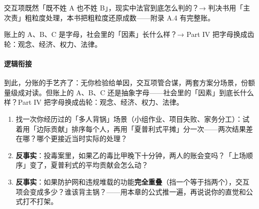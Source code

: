 \documentclass[../../main2.tex]{subfiles}
\begin{document}
\begin{reader_anticipation}
	\item 交互项既然「既不姓 A 也不姓 B」，现实中法官到底怎么判的？→ 判决书用「主次责」粗粒度处理，本书把粗粒度还原成数——附录 A.4 有完整账。
	\item 账上的 A、B、C 是字母，社会里的「因素」长什么样？→ Part IV 把字母换成齿轮：观念、经济、权力、法律。
\end{reader_anticipation}

\paragraph*{逻辑衔接}
	到此，分账的手艺齐了：无你检验给单因，交互项管合谋，两套方案分场景，份额量级成对读。但账上的 A、B、C 还是抽象字母——社会里的「因素」到底长什么样？Part IV 把字母换成齿轮：观念、经济、权力、法律。

\begin{thinkbox}
\begin{enumerate}
	\item 找一次你经历过的「多人背锅」场景（小组作业、项目失败、家务分工）：试着用「边际贡献」排序每个人，再用「夏普利式平摊」分一次——两次结果差在哪？哪个更接近当时实际的处理？
	\item \textbf{反事实}：投毒案里，如果乙的毒比甲晚下十分钟，两人的账会变吗？「上场顺序」变了，夏普利式的平均贡献会怎么动？
	\item \textbf{反事实}：如果防护网和违规堆载的功能\textbf{完全重叠}（挡一个等于挡两个），交互项会变成多少？谁该背主锅？——用本章的公式推一遍，再说说你的直觉和公式打不打架。
\end{enumerate}
\end{thinkbox}
\end{document}
